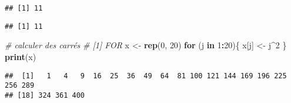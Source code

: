 \documentclass[]{book}
\newenvironment{Shaded}{\begin{snugshade}}{\end{snugshade}}
\newcommand{\KeywordTok}[1]{\textcolor[rgb]{0.13,0.29,0.53}{\textbf{#1}}}
\newcommand{\DataTypeTok}[1]{\textcolor[rgb]{0.13,0.29,0.53}{#1}}
\newcommand{\DecValTok}[1]{\textcolor[rgb]{0.00,0.00,0.81}{#1}}
\newcommand{\StringTok}[1]{\textcolor[rgb]{0.31,0.60,0.02}{#1}}
\newcommand{\CommentTok}[1]{\textcolor[rgb]{0.56,0.35,0.01}{\textit{#1}}}
\newcommand{\ControlFlowTok}[1]{\textcolor[rgb]{0.13,0.29,0.53}{\textbf{#1}}}
\newcommand{\OperatorTok}[1]{\textcolor[rgb]{0.81,0.36,0.00}{\textbf{#1}}}
\newcommand{\NormalTok}[1]{#1}
\theoremstyle{definition}
\theoremstyle{definition}
\theoremstyle{definition}
\theoremstyle{remark}
\begin{document}
\begin{Shaded}
\end{Shaded}

\begin{verbatim}
## [1] 11
\end{verbatim}

\begin{Shaded}
\end{Shaded}

\begin{verbatim}
## [1] 11
\end{verbatim}

\begin{Shaded}
\begin{Highlighting}[]
\CommentTok{# calculer des carrés}
\CommentTok{# [1] FOR}
\NormalTok{x <-}\StringTok{ }\KeywordTok{rep}\NormalTok{(}\DecValTok{0}\NormalTok{, }\DecValTok{20}\NormalTok{)}
\ControlFlowTok{for}\NormalTok{ (j }\ControlFlowTok{in} \DecValTok{1}\OperatorTok{:}\DecValTok{20}\NormalTok{)\{}
\NormalTok{  x[j] <-}\StringTok{ }\NormalTok{j}\OperatorTok{^}\DecValTok{2}
\NormalTok{\}}
\KeywordTok{print}\NormalTok{(x)}
\end{Highlighting}
\end{Shaded}

\begin{verbatim}
##  [1]   1   4   9  16  25  36  49  64  81 100 121 144 169 196 225 256 289
## [18] 324 361 400
\end{verbatim}
\end{document}
